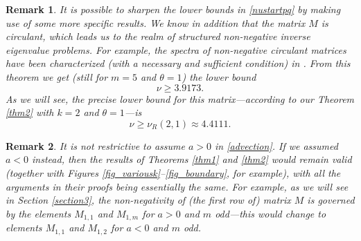 \documentclass[a4paper]{article}
\newtheorem{remark}{Remark}
\newcommand{\te}{\theta}
\begin{document}
\begin{remark}
It is possible to sharpen the lower bounds in \eqref{nustartpq} by making use of some more specific results. 
We know in addition that the matrix $M$ is \emph{circulant}, which leads us to the realm of 
\emph{structured non-negative inverse eigenvalue problems}. For example, 
the spectra of non-negative circulant matrices have been characterized (with a necessary \emph{and} sufficient condition) in \cite[Theorem 10]{rojosoto}. From this theorem we get (still for $m=5$ and $\te=1$) the lower bound
\[
\nu\ge 3.9173.
\]
As we will see, the precise lower bound for this matrix---according to our Theorem \ref{thm2} with $k=2$ and $\te=1$---is
\[
\nu\ge \nu_R(2,1)\approx 4.4111.
\]
\end{remark}

\begin{remark}
It is not restrictive to assume $a>0$ in \eqref{advection}. If we assumed $a<0$ instead, then the results of Theorems \ref{thm1} and \ref{thm2} would remain valid (together with Figures \ref{fig_variousk}--\ref{fig_boundary}, for example), with all the arguments in their proofs being essentially the same.  For example, as we will see in Section \ref{section3}, the non-negativity of (the first row of) matrix $M$ is governed by the elements $M_{1,1}$ and $M_{1,m}$ for $a>0$ and $m$ odd---this would change to elements $M_{1,1}$ and $M_{1,2}$ for $a<0$ and $m$ odd.
\end{remark}

\end{document}

